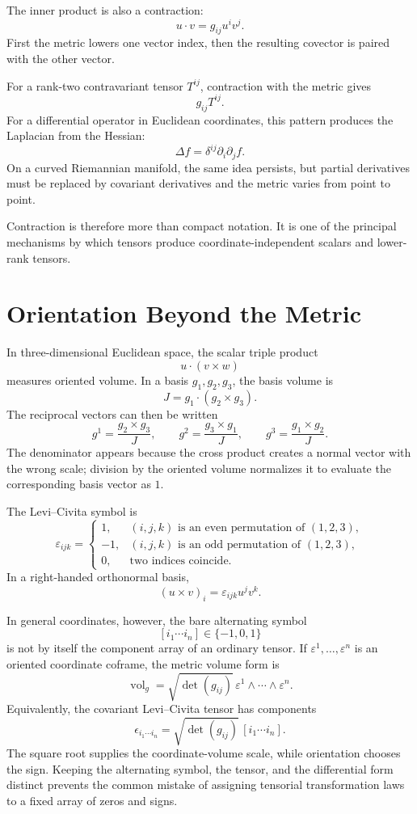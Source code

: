 The inner product is also a contraction:
\[
  u\cdot v=g_{ij}u^iv^j.
\]
First the metric lowers one vector index, then the resulting covector is paired with the other vector.

For a rank-two contravariant tensor \(T^{ij}\), contraction with the metric gives
\[
  g_{ij}T^{ij}.
\]
For a differential operator in Euclidean coordinates, this pattern produces the Laplacian from the Hessian:
\[
  \Delta f=\delta^{ij}\partial_i\partial_j f.
\]
On a curved Riemannian manifold, the same idea persists, but partial derivatives must be replaced by covariant derivatives and the metric varies from point to point.

Contraction is therefore more than compact notation.  It is one of the principal mechanisms by which tensors produce coordinate-independent scalars and lower-rank tensors.

\section{Orientation Beyond the Metric}

In three-dimensional Euclidean space, the scalar triple product
\[
  u\cdot(v\times w)
\]
measures oriented volume.  In a basis \(g_1,g_2,g_3\), the basis volume is
\[
  J=g_1\cdot(g_2\times g_3).
\]
The reciprocal vectors can then be written
\[
  g^1=\frac{g_2\times g_3}{J},
  \qquad
  g^2=\frac{g_3\times g_1}{J},
  \qquad
  g^3=\frac{g_1\times g_2}{J}.
\]
The denominator appears because the cross product creates a normal vector with the wrong scale; division by the oriented volume normalizes it to evaluate the corresponding basis vector as \(1\).

The Levi--Civita symbol is
\[
  \varepsilon_{ijk}=
  \begin{cases}
    1,&(i,j,k)\text{ is an even permutation of }(1,2,3),\\
    -1,&(i,j,k)\text{ is an odd permutation of }(1,2,3),\\
    0,&\text{two indices coincide.}
  \end{cases}
\]
In a right-handed orthonormal basis,
\[
  (u\times v)_i
  =\varepsilon_{ijk}u^jv^k.
\]

In general coordinates, however, the bare alternating symbol
\[
  [i_1\cdots i_n]\in\{-1,0,1\}
\]
is not by itself the component array of an ordinary tensor.  If \(\varepsilon^1,\ldots,\varepsilon^n\) is an oriented coordinate coframe, the metric volume form is
\[
  \operatorname{vol}_g
  =\sqrt{\det(g_{ij})}\,
   \varepsilon^1\wedge\cdots\wedge\varepsilon^n.
\]
Equivalently, the covariant Levi--Civita tensor has components
\[
  \epsilon_{i_1\cdots i_n}
  =\sqrt{\det(g_{ij})}\,[i_1\cdots i_n].
\]
The square root supplies the coordinate-volume scale, while orientation chooses the sign.  Keeping the alternating symbol, the tensor, and the differential form distinct prevents the common mistake of assigning tensorial transformation laws to a fixed array of zeros and signs.

